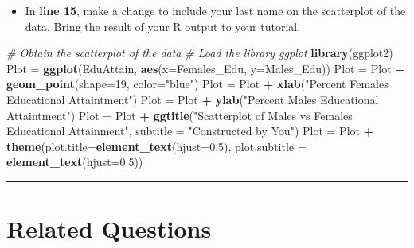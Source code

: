 \documentclass[oneside,openany]{book}
\newenvironment{Shaded}{\begin{snugshade}}{\end{snugshade}}
\newcommand{\AttributeTok}[1]{\textcolor[rgb]{0.13,0.29,0.53}{#1}}
\newcommand{\CommentTok}[1]{\textcolor[rgb]{0.56,0.35,0.01}{\textit{#1}}}
\newcommand{\DecValTok}[1]{\textcolor[rgb]{0.00,0.00,0.81}{#1}}
\newcommand{\FloatTok}[1]{\textcolor[rgb]{0.00,0.00,0.81}{#1}}
\newcommand{\FunctionTok}[1]{\textcolor[rgb]{0.13,0.29,0.53}{\textbf{#1}}}
\newcommand{\NormalTok}[1]{#1}
\newcommand{\OtherTok}[1]{\textcolor[rgb]{0.56,0.35,0.01}{#1}}
\newcommand{\SpecialCharTok}[1]{\textcolor[rgb]{0.81,0.36,0.00}{\textbf{#1}}}
\newcommand{\StringTok}[1]{\textcolor[rgb]{0.31,0.60,0.02}{#1}}
\providecommand{\tightlist}{%
  \setlength{\itemsep}{0pt}\setlength{\parskip}{0pt}}
\begin{document}
\begin{enumerate}
  \begin{itemize}
  \tightlist
  \item
    In \textbf{line 15}, make a change to include your last name on the scatterplot of the data. Bring the result of your R output to your tutorial.
  \end{itemize}

\begin{Shaded}
\begin{Highlighting}[]
\CommentTok{\# Obtain the scatterplot of the data}
\CommentTok{\# Load the library ggplot}
\FunctionTok{library}\NormalTok{(ggplot2)}
\NormalTok{Plot }\OtherTok{=} \FunctionTok{ggplot}\NormalTok{(EduAttain, }\FunctionTok{aes}\NormalTok{(}\AttributeTok{x=}\NormalTok{Females\_Edu, }\AttributeTok{y=}\NormalTok{Males\_Edu))}
\NormalTok{Plot }\OtherTok{=}\NormalTok{ Plot }\SpecialCharTok{+} \FunctionTok{geom\_point}\NormalTok{(}\AttributeTok{shape=}\DecValTok{19}\NormalTok{, }\AttributeTok{color=}\StringTok{"blue"}\NormalTok{)}
\NormalTok{Plot }\OtherTok{=}\NormalTok{ Plot }\SpecialCharTok{+} \FunctionTok{xlab}\NormalTok{(}\StringTok{"Percent Females Educational Attaintment"}\NormalTok{) }
\NormalTok{Plot }\OtherTok{=}\NormalTok{ Plot }\SpecialCharTok{+} \FunctionTok{ylab}\NormalTok{(}\StringTok{"Percent Males Educational Attaintment"}\NormalTok{)}
\NormalTok{Plot }\OtherTok{=}\NormalTok{ Plot }\SpecialCharTok{+} \FunctionTok{ggtitle}\NormalTok{(}\StringTok{"Scatterplot of Males vs Females Educational Attainment"}\NormalTok{, }
                      \AttributeTok{subtitle =} \StringTok{"Constructed by You"}\NormalTok{)}
\NormalTok{Plot }\OtherTok{=}\NormalTok{ Plot }\SpecialCharTok{+} \FunctionTok{theme}\NormalTok{(}\AttributeTok{plot.title=}\FunctionTok{element\_text}\NormalTok{(}\AttributeTok{hjust=}\FloatTok{0.5}\NormalTok{), }
                    \AttributeTok{plot.subtitle =} \FunctionTok{element\_text}\NormalTok{(}\AttributeTok{hjust=}\FloatTok{0.5}\NormalTok{))  }
\end{Highlighting}
\end{Shaded}
\end{enumerate}

\begin{center}\rule{0.5\linewidth}{0.5pt}\end{center}

\section{Related Questions}\label{related-questions}
\end{document}
